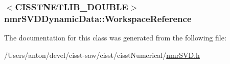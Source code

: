 \subsubsection[{Workspace\+Reference}]{$<$C\+I\+S\+S\+T\+N\+E\+T\+L\+I\+B\+\_\+\+D\+O\+U\+B\+L\+E$>$ nmr\+S\+V\+D\+Dynamic\+Data\+::\+Workspace\+Reference\hspace{0.3cm}{\ttfamily [protected]}}\label{classnmr_s_v_d_dynamic_data_a616c1ec08f23128458db53bbfb1fa0b2}


The documentation for this class was generated from the following file\+:\begin{DoxyCompactItemize}
\item 
/\+Users/anton/devel/cisst-\/saw/cisst/cisst\+Numerical/\hyperlink{nmr_s_v_d_8h}{nmr\+S\+V\+D.\+h}\end{DoxyCompactItemize}
